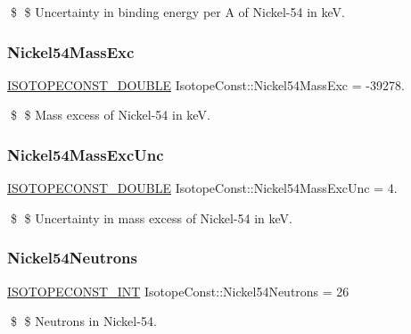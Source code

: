\$ \$ Uncertainty in binding energy per A of Nickel-\/54 in keV. \mbox{\label{group___isotope_const-_nickel-_ni54_ga11b82f9f2ead47c43ecfabaf4c46e4ed}} 
\subsubsection{\texorpdfstring{Nickel54\+Mass\+Exc}{Nickel54MassExc}}
{\footnotesize\ttfamily \mbox{\hyperlink{group___isotope_const-_macros_ga8f45a7272ce02c0b4c65c44636ed719a}{I\+S\+O\+T\+O\+P\+E\+C\+O\+N\+S\+T\+\_\+\+D\+O\+U\+B\+LE}} Isotope\+Const\+::\+Nickel54\+Mass\+Exc = -\/39278.}

\$ \$ Mass excess of Nickel-\/54 in keV. \mbox{\label{group___isotope_const-_nickel-_ni54_ga09406dd16135d220af0963dea8a23e73}} 
\subsubsection{\texorpdfstring{Nickel54\+Mass\+Exc\+Unc}{Nickel54MassExcUnc}}
{\footnotesize\ttfamily \mbox{\hyperlink{group___isotope_const-_macros_ga8f45a7272ce02c0b4c65c44636ed719a}{I\+S\+O\+T\+O\+P\+E\+C\+O\+N\+S\+T\+\_\+\+D\+O\+U\+B\+LE}} Isotope\+Const\+::\+Nickel54\+Mass\+Exc\+Unc = 4.}

\$ \$ Uncertainty in mass excess of Nickel-\/54 in keV. \mbox{\label{group___isotope_const-_nickel-_ni54_ga9455a61a53164e4e78be52b5c02dfa41}} 
\subsubsection{\texorpdfstring{Nickel54\+Neutrons}{Nickel54Neutrons}}
{\footnotesize\ttfamily \mbox{\hyperlink{group___isotope_const-_macros_ga5f18360b3e99483a35c32d789e62621c}{I\+S\+O\+T\+O\+P\+E\+C\+O\+N\+S\+T\+\_\+\+I\+NT}} Isotope\+Const\+::\+Nickel54\+Neutrons = 26}

\$ \$ Neutrons in Nickel-\/54. \mbox{\label{group___isotope_const-_nickel-_ni54_ga92e4b24164c981bb35394b06258f7754}} 
